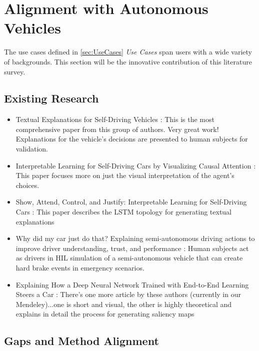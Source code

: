 \section{Alignment with Autonomous Vehicles}\label{sec:Alignment}

The use cases defined in \ref{sec:UseCases} \textit{Use Cases} span users with a wide variety of backgrounds.  This section will be the innovative contribution of this literature survey.

\subsection{Existing Research}



\begin{itemize}
    \item Textual Explanations for Self-Driving Vehicles \cite{kim2018textual}: This is the most comprehensive paper from this group of authors.  Very great work!  Explanations for the vehicle's decisions are presented to human subjects for validation.

    \item Interpretable Learning for Self-Driving Cars by Visualizing Causal Attention \cite{Kim2017InterpretableLF}:  This paper focuses more on just the visual interpretation of the agent's choices.

    \item Show, Attend, Control, and Justify: Interpretable Learning for Self-Driving Cars \cite{Kim2017ShowA}: This paper describes the LSTM topology for generating textual explanations

    \item Why did my car just do that? Explaining semi-autonomous driving actions to improve driver understanding, trust, and performance \cite{Koo2015}:  Human subjects act as drivers in HIL simulation of a semi-autonomous vehicle that can create hard brake events in emergency scenarios.
    
    \item Explaining How a Deep Neural Network Trained with End-to-End Learning Steers a Car \cite{Bojarski2017ExplainingHA}: There's one more article by these authors (currently in our Mendeley)...one is short and visual, the other is highly theoretical and explains in detail the process for generating saliency maps
\end{itemize}

\subsection{Gaps and Method Alignment}



